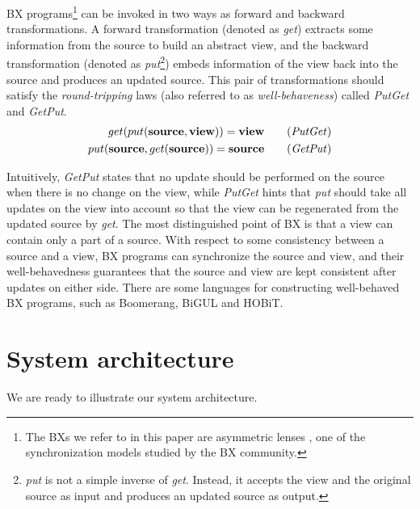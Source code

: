\documentclass[conference]{IEEEtran}
\begin{document}
	BX programs\footnote{The BXs we refer to in this paper are asymmetric lenses \cite{foster2007combinators}, one of the synchronization models studied by the BX community. } can be invoked in two ways as forward and backward transformations. A forward transformation (denoted as \emph{get}) extracts some information from the source to build an abstract view, and the backward transformation (denoted as \emph{put}\footnote{\emph{put} is not a simple inverse of \emph{get}. Instead, it accepts the view and the original source as input and produces an updated source as output.}) embeds information of the view back into the source and produces an updated source. This pair of transformations should satisfy the {\em round-tripping} laws (also referred to as {\em well-behaveness}) called \emph{PutGet} and \emph{GetPut}. 
	\begin{align}
	get (put(\textbf{source}, \textbf{view}))= \textbf{view} \tag {\emph{PutGet}} \\
	put (\textbf{source}, get (\textbf{source})) = \textbf{source} \tag {\emph{GetPut}} 
	\end{align}
	
	Intuitively, \emph{GetPut} states that no update should be performed on the source when there is no change on the view, while \emph{PutGet} hints that \emph{put} should take all updates on the view into account so that the view can be regenerated from the updated source by \emph{get}. 
	The most distinguished point of BX is that a view can contain only a part of a source. With respect to some consistency between a source and a view, BX programs can synchronize the source and view, and their well-behavedness guarantees that the source and view are kept consistent after updates on either side. There are some languages for constructing well-behaved BX programs, such as Boomerang\cite{bohannon2008boomerang}, BiGUL \cite{bigul} and HOBiT\cite{matsuda2018hobit}.
	


\section{System architecture}

\label{system}
     We are ready to illustrate our system architecture. 
     
\end{document}
